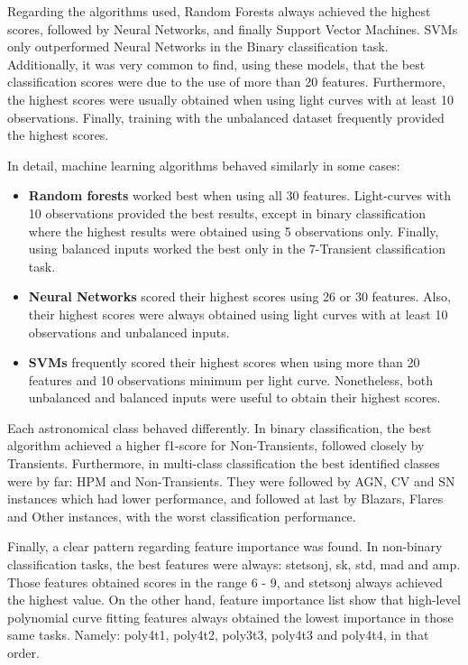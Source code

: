 \documentclass[a4paper,fleqn,usenatbib]{mnras}
\begin{document}
Regarding the algorithms used, Random Forests always achieved the
highest scores, followed by Neural Networks, and finally Support
Vector Machines. SVMs only outperformed Neural Networks in the Binary
classification task. Additionally, it was very common to find, using
these models, that the best classification scores were due to the use
of more than 20 features. Furthermore, the highest scores were usually
obtained when using light curves with at least 10
observations. Finally, training with the unbalanced dataset frequently
provided the highest scores. 

In detail, machine learning algorithms behaved similarly in some
cases: 

\begin{itemize}
    \item \textbf{Random forests} worked best when using all 30
      features. Light-curves with 10 observations provided the best
      results, except in binary classification where the highest
      results were obtained using 5 observations only. Finally, using
      balanced inputs worked the best only in the 7-Transient
      classification task.  
    \item \textbf{Neural Networks} scored their highest scores using
      26 or 30 features. Also, their highest scores were always
      obtained using light curves with at least 10 observations and
      unbalanced inputs. 
    \item \textbf{SVMs} frequently scored their highest scores when
      using more than 20 features and 10 observations minimum per
      light curve. Nonetheless, both unbalanced and balanced inputs
      were useful to obtain their highest scores. 
\end{itemize}

Each astronomical class behaved differently. In binary classification,
the best algorithm achieved a higher f1-score for Non-Transients,
followed closely by Transients. Furthermore, in multi-class
classification the best identified classes were by far: HPM and
Non-Transients. They were followed by AGN, CV and SN instances which
had lower performance, and followed at last by Blazars, Flares and
Other instances, with the worst classification performance.  


Finally, a clear pattern regarding feature importance was found. In non-binary classification tasks, the best features were always: stetson\textunderscore j, sk, std, mad and amp. Those features obtained scores in the range 6 - 9, and stetson\textunderscore j always achieved the highest value. On the other hand, feature importance list show that high-level polynomial curve fitting features always obtained the lowest importance in those same tasks. Namely: poly4\textunderscore t1, poly4\textunderscore t2, poly3\textunderscore t3, poly4\textunderscore t3 and poly4\textunderscore t4, in that order.
\end{document}
